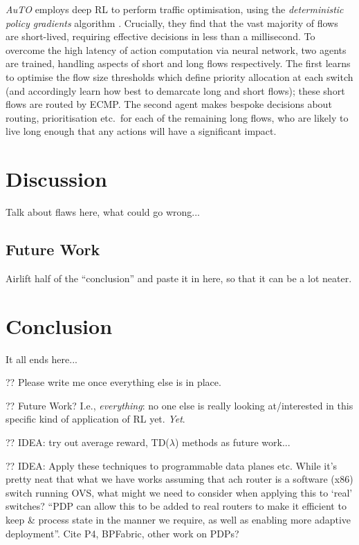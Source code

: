\documentclass[conference, letterpaper, 10pt, times]{IEEEtran}
\begin{document}
\emph{AuTO} \cite{DBLP:conf/sigcomm/ChenL0L18} employs deep RL to perform traffic optimisation, using the \emph{deterministic policy gradients} algorithm \cite{DBLP:conf/icml/SilverLHDWR14}.
Crucially, they find that the vast majority of flows are short-lived, requiring effective decisions in less than a millisecond.
To overcome the high latency of action computation via neural network, two agents are trained, handling aspects of short and long flows respectively.
The first learns to optimise the flow size thresholds which define priority allocation at each switch (and accordingly learn how best to demarcate long and short flows); these short flows are routed by ECMP.
The second agent makes bespoke decisions about routing, prioritisation etc.\ for each of the remaining long flows, who are likely to live long enough that any actions will have a significant impact.


\section{Discussion}

Talk about flaws here, what could go wrong...

\subsection{Future Work}

Airlift half of the ``conclusion'' and paste it in here, so that it can be a lot neater.

\section{Conclusion}

It all ends here...

?? Please write me once everything else is in place.

?? Future Work? I.e., \emph{everything}: no one else is really looking at/interested in this specific kind of application of RL yet. \emph{Yet}.

?? IDEA: try out average reward, TD($\lambda$) methods as future work...

?? IDEA: Apply these techniques to programmable data planes etc. While it's pretty neat that what we have works assuming that ach router is a software (x86) switch running OVS, what might we need to consider when applying this to `real' switches? ``PDP can allow this to be added to real routers to make it efficient to keep \& process state in the manner we require, as well as enabling more adaptive deployment''. Cite P4, BPFabric, other work on PDPs?
\end{document}
